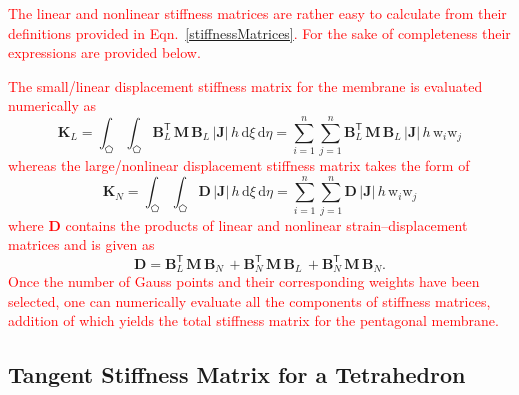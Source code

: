 \textcolor{red}{The linear and nonlinear stiffness matrices are rather easy to calculate from their definitions provided in Eqn.~\eqref{stiffnessMatrices}. For the sake of completeness their expressions are provided below.}

\textcolor{red}{The small/linear displacement stiffness matrix for the membrane is evaluated numerically as} 
\begin{equation}
\mathbf{K}_{L} = \int_{\pentagon} \int_{\pentagon} \mathbf{B}_L^{\mathsf{T}} \, \mathbf{M} \, \mathbf{B}_L \, |\mathbf{J}| \, h \,  \mathrm{d} \xi \,  \mathrm{d} \eta =  \sum_{i=1}^{n} \sum_{j=1}^{n} \mathbf{B}_L^{\mathsf{T}} \, \mathbf{M} \, \mathbf{B}_L \, |\mathbf{J}|  \, h \, \mathrm{w}_i \mathrm{w}_j
\end{equation}
\textcolor{red}{whereas the large/nonlinear displacement stiffness matrix takes the form of}
\begin{equation}
\mathbf{K}_{N} = \int_{\pentagon} \int_{\pentagon} \mathbf{D} \, |\mathbf{J}|\, h \, \mathrm{d} \xi \, \mathrm{d} \eta 
= \sum_{i=1}^{n} \sum_{j=1}^{n} \mathbf{D} \, |\mathbf{J}| \, h \, \mathrm{w}_i \mathrm{w}_j
\end{equation}
\textcolor{red}{where $\mathbf{D}$ contains the products of linear and nonlinear strain--displacement matrices and is given as} 
\begin{equation}
\mathbf{D} = \mathbf{B}_L^{\mathsf{T}} \, \mathbf{M} \, \mathbf{B}_N \, + \mathbf{B}_N^{\mathsf{T}} \, \mathbf{M} \, \mathbf{B}_L \, + \mathbf{B}_N^{\mathsf{T}} \, \mathbf{M} \, \mathbf{B}_N.
\end{equation}
\textcolor{red}{Once the number of Gauss points and their corresponding weights have been selected, one can numerically evaluate all the components of stiffness matrices, addition of which yields the total stiffness matrix for the pentagonal membrane.}


\subsection{Tangent Stiffness Matrix for a Tetrahedron}


